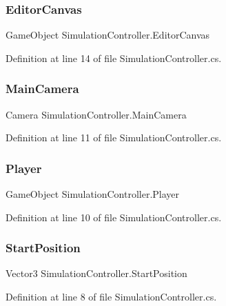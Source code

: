 \subsubsection{Editor\+Canvas}
{\footnotesize\ttfamily Game\+Object Simulation\+Controller.\+Editor\+Canvas}



Definition at line 14 of file Simulation\+Controller.\+cs.

\mbox{\label{class_simulation_controller_a6b15d3d62d4449712459a07f03c8459c}} 
\subsubsection{Main\+Camera}
{\footnotesize\ttfamily Camera Simulation\+Controller.\+Main\+Camera}



Definition at line 11 of file Simulation\+Controller.\+cs.

\mbox{\label{class_simulation_controller_ab174aadce1068f50bdd3135c982df236}} 
\subsubsection{Player}
{\footnotesize\ttfamily Game\+Object Simulation\+Controller.\+Player}



Definition at line 10 of file Simulation\+Controller.\+cs.

\mbox{\label{class_simulation_controller_aa882551c6a4154bd5674e7a727368191}} 
\subsubsection{Start\+Position}
{\footnotesize\ttfamily Vector3 Simulation\+Controller.\+Start\+Position}



Definition at line 8 of file Simulation\+Controller.\+cs.

\mbox{\label{class_simulation_controller_ad5001b67c6cd24716f1c193e0247b5a0}} 
